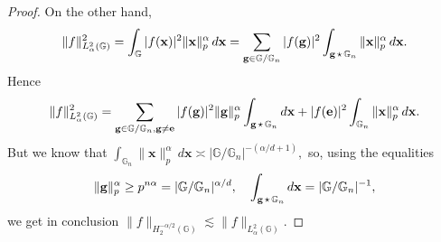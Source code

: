 \documentclass[10pt,a4paper]{amsart}
\newcommand{\G}{\mathbb{G}}
\newcommand{\smallstar}{\scalebox{0.8}{$\, \star \, $}}
\begin{document}
\begin{proof}
On the other hand,
\[
\|f\|^2_{L^2_\alpha(\mathbb{G})} 
= \int_{\mathbb{G}} |f(\mathbf{x})|^2 \|\mathbf{x}\|^\alpha_p \, d\mathbf{x}
= \sum_{\mathbf{g} \in \G / \mathbb{G}_n} |f(\mathbf{g})|^2 \int_{\mathbf{g} \smallstar \mathbb{G}_n} \|\mathbf{x}\|^\alpha_p \, d\mathbf{x}.
\]
Hence
\[
\|f\|^2_{L^2_\alpha(\mathbb{G})}
= \sum_{\mathbf{g} \in \mathbb{G} / \mathbb{G}_n, \mathbf{g} \neq \mathbf{e}} |f(\mathbf{g})|^2 \|\mathbf{g}\|^\alpha_p \int_{\mathbf{g} \smallstar \mathbb{G}_n} d\mathbf{x}
+ |f(\mathbf{e})|^2 \int_{\mathbb{G}_n} \|\mathbf{x}\|^\alpha_p \, d\mathbf{x}.
\]
But we know that $\int_{\mathbb{G}_n} \|\mathbf{x}\|^\alpha_p \, d\mathbf{x} \asymp |\mathbb{G} / \mathbb{G}_n|^{-(\alpha/d+1)},$ so, using the equalities $$\| \mathbf{g} \|_p^\alpha \geq p^{n \alpha} = |\G / \G_n|^{\alpha/d}, \quad \int_{\mathbf{g} \smallstar \mathbb{G}_n} d\mathbf{x} = |\G / \G_n|^{-1}, $$
we get in conclusion $\|f\|_{H^{-\alpha/2}_2(\mathbb{G})} \lesssim \|f\|_{L^2_\alpha(\mathbb{G})}.$

\end{proof}
\end{document}
